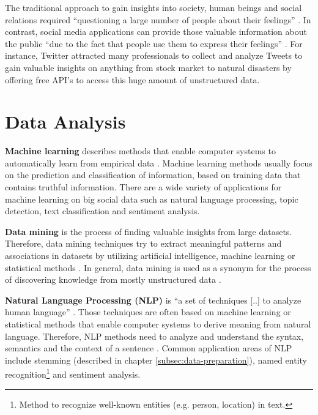 The traditional approach to gain insights into society, human beings and social relations required \enquote{questioning a large number of people about their feelings} \cite[1]{flaounas2012big}. In contrast, social media applications can provide those valuable information about the public \enquote{due to the fact that people use them to express their feelings} \cite[1]{flaounas2012big}. For instance, Twitter attracted many professionals to collect and analyze Tweets to gain valuable insights on anything from stock market to natural disasters by offering free API’s to access this huge amount of unstructured data.

\section{Data Analysis}
\label{sec:data-analysis}

\textbf{Machine learning} describes methods that enable computer systems to automatically learn from empirical data \cite{Domingos:2012:FUT:2347736.2347755,McKinsey2011}. Machine learning methods usually focus on the prediction and classification of information, based on training data that contains truthful information. There are a wide variety of applications for machine learning on big social data such as natural language processing, topic detection, text classification and sentiment analysis.

\vspace{10 mm}
\textbf{Data mining} is the process of finding valuable insights from large datasets. Therefore, data mining techniques try to extract meaningful patterns and associations in datasets by utilizing artificial intelligence, machine learning or statistical methods \cite{han2012mining}. In general, data mining is used as a synonym for the process of discovering knowledge from mostly unstructured data \cite[6\psqq]{han2012mining}.

\vspace{10 mm}
\textbf{Natural Language Processing (NLP)} is \enquote{a set of techniques [..] to analyze human language} \cite[29]{McKinsey2011}. Those techniques are often based on machine learning or statistical methods that enable computer systems to derive meaning from natural language. Therefore, NLP methods need to analyze and understand the syntax, semantics and the context of a sentence \cite{Linckels:2011:ESU:1995306}. Common application areas of NLP include stemming (described in chapter \ref{subsec:data-preparation}), named entity  recognition\footnote{Method to recognize well-known entities (e.g. person, location) in text.} and sentiment analysis.

